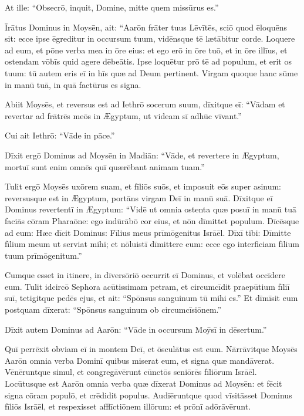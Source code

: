 At ille: ``Obsecrō, inquit, Domine,
mitte quem missūrus es.''

Īrātus Dominus in Moysēn, ait: ``Aarōn frāter tuus Lēvītēs,
sciō quod ēloquēns sit: ecce ipse ēgreditur in occursum tuum,
vidēnsque tē lætābitur corde.
Loquere ad eum, et pōne verba mea in ōre eius:
et ego erō in ōre tuō, et in ōre illīus,
et ostendam vōbīs quid agere dēbeātis.
Ipse loquētur prō tē ad populum,
et erit os tuum:
tū autem eris eī in hīs quæ ad Deum pertinent.
Virgam quoque hanc sūme in manū tuā,
in quā factūrus es signa.

Abiit Moysēs, et reversus est ad Iethrō socerum suum,
dīxitque eī: ``Vādam et revertar ad frātrēs meōs in Ægyptum,
ut videam sī adhūc vīvant.''

Cui ait Iethrō: ``Vāde in pāce.''

Dīxit ergō Dominus ad Moysēn in Madiān: ``Vāde, et revertere in Ægyptum,
mortuī sunt enim omnēs quī quærēbant animam tuam.''

Tulit ergō Moysēs uxōrem suam, et fīliōs suōs,
et imposuit eōs super asinum: reversusque est in Ægyptum,
portāns virgam Deī in manū suā. Dīxitque eī Dominus revertentī
in Ægyptum: ``Vidē ut omnia ostenta quæ posuī in manū tuā
faciās cōram Pharaōne: ego indūrābō cor eius,
et nōn dīmittet populum. Dīcēsque ad eum: Hæc
dīcit Dominus: Fīlius meus prīmōgenitus Isrāēl.
Dīxī tibi: Dīmitte fīlium meum ut serviat mihi;
et nōluistī dīmittere eum:
ecce ego interficiam fīlium tuum prīmōgenitum.''

Cumque esset in itinere, in dīversōriō
occurrit eī Dominus, et volēbat occīdere eum. 
Tulit idcircō Sephora acūtissimam petram,
et circumcīdit praepūtium fīliī suī, tetigitque pedēs ejus,
et ait: ``Spōnsus sanguinum tū mihi es.''
Et dīmīsit eum postquam dīxerat: ``Spōnsus sanguinum ob circumcīsiōnem.''

Dīxit autem Dominus ad Aarōn: ``Vāde in occursum Moȳsī
in dēsertum.'' 

Quī perrēxit obviam eī in montem Deī, et ōsculātus est eum.
Nārrāvitque Moysēs Aarōn omnia verba Dominī quibus miserat eum,
et signa quæ mandāverat. Vēnēruntque simul, et congregāvērunt
cūnctōs seniōrēs fīliōrum Isrāēl.
Locūtusque est Aarōn omnia verba quæ dīxerat Dominus ad Moysēn: et
fēcit signa cōram populō, et crēdidit populus.
Audiēruntque quod vīsitāsset Dominus fīliōs Isrāēl,
et respexisset afflīctiōnem illōrum: et prōnī adōrāvērunt.
